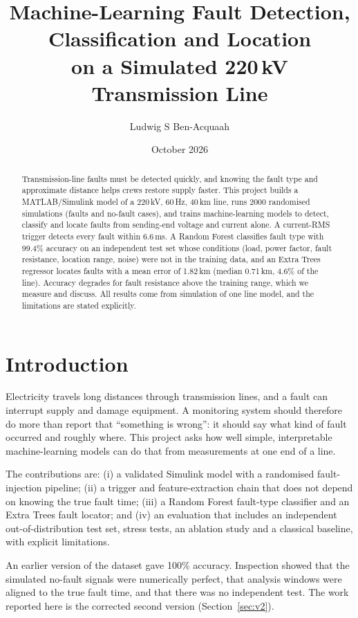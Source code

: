 \documentclass[11pt,a4paper]{article}
\title{Machine-Learning Fault Detection, Classification and Location\\on a Simulated 220\,kV Transmission Line}
\author{Ludwig S Ben-Acquaah}
\date{October 2026}
\begin{document}
\maketitle

\begin{abstract}
Transmission-line faults must be detected quickly, and knowing the fault type and approximate distance helps crews restore supply faster. This project builds a MATLAB/Simulink model of a 220\,kV, 60\,Hz, 40\,km line, runs 2000 randomised simulations (faults and no-fault cases), and trains machine-learning models to detect, classify and locate faults from sending-end voltage and current alone. A current-RMS trigger detects every fault within 6.6\,ms. A Random Forest classifies fault type with 99.4\% accuracy on an independent test set whose conditions (load, power factor, fault resistance, location range, noise) were not in the training data, and an Extra Trees regressor locates faults with a mean error of 1.82\,km (median 0.71\,km, 4.6\% of the line). Accuracy degrades for fault resistance above the training range, which we measure and discuss. All results come from simulation of one line model, and the limitations are stated explicitly.
\end{abstract}

\section{Introduction}
Electricity travels long distances through transmission lines, and a fault can interrupt supply and damage equipment. A monitoring system should therefore do more than report that ``something is wrong'': it should say what kind of fault occurred and roughly where. This project asks how well simple, interpretable machine-learning models can do that from measurements at one end of a line.

The contributions are: (i) a validated Simulink model with a randomised fault-injection pipeline; (ii) a trigger and feature-extraction chain that does not depend on knowing the true fault time; (iii) a Random Forest fault-type classifier and an Extra Trees fault locator; and (iv) an evaluation that includes an independent out-of-distribution test set, stress tests, an ablation study and a classical baseline, with explicit limitations.

An earlier version of the dataset gave 100\% accuracy. Inspection showed that the simulated no-fault signals were numerically perfect, that analysis windows were aligned to the true fault time, and that there was no independent test. The work reported here is the corrected second version (Section~\ref{sec:v2}).
\end{document}
